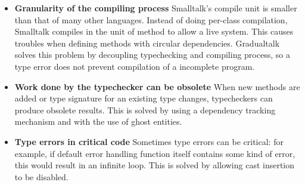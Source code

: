 \begin{itemize}
	\item \textbf{Granularity of the compiling process}
	Smalltalk's compile unit is smaller than that of many other languages.
	Instead of doing per-class compilation, Smalltalk compiles in the unit of method to
	allow a live system. This causes troubles when defining methods with circular dependencies.
	Gradualtalk solves this problem by decoupling typechecking and compiling process,
	so a type error does not prevent compilation of a incomplete program.
	\item \textbf{Work done by the typechecker can be obsolete}
	When new methods are added or type signature for an existing type changes,
	typecheckers can produce obsolete results. This is solved by using a dependency tracking
	mechanism and with the use of ghost entities.
	\item \textbf{Type errors in critical code} Sometimes type errors can be critical:
	for example, if default error handling function itself contains some kind of error,
	this would result in an infinite loop. This is solved by allowing cast insertion
	to be disabled.
\end{itemize}
